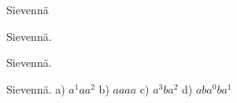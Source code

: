 \begin{tehtavasivu}
\begin{tehtava}
  		Sievennä
        \begin{alakohdatrivi}
 		\end{alakohdatrivi}
        \begin{vastaus}
        \begin{alakohdatrivi}
        \end{alakohdatrivi}
        \end{vastaus}
\end{tehtava}

\begin{tehtava}
  		Sievennä.
        \begin{alakohdat}
 		\end{alakohdat}
        \begin{vastaus}
        \begin{alakohdatrivi}
        \end{alakohdatrivi}
        \end{vastaus}
\end{tehtava}

    \begin{tehtava}
    Sievennä.
        \begin{alakohdatrivi}
		\end{alakohdatrivi}        
        \begin{vastaus}
        \begin{alakohdat}
        \end{alakohdat}
        \end{vastaus}
    \end{tehtava}

    \begin{tehtava}
        Sievennä. 
        a) $a^1 a a^2$ 
        b) $aaaa$ 
        c) $a^3ba^2$ 
        d) $aba^0ba^1$
        

\end{tehtava}
\end{tehtavasivu}
